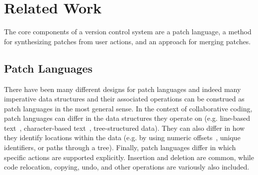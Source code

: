 
\section{Related Work}%
\label{sec:Related Work}

The core components of a version control system are a patch language, a method for synthesizing patches from user actions, and an approach for merging patches. 




\subsection{Patch Languages}
There have been many different designs for patch languages and indeed many imperative data structures and their associated operations can be construed as patch languages in the most general sense. In the context of collaborative coding, patch languages can differ in the data structures they operate on (e.g. line-based text~\cite{DBLP:conf/haskell/Roundy05}, character-based text~\cite{DBLP:conf/sigmod/EllisG89,DBLP:journals/pacmhci/LittLKH22}, tree-structured data). 
They can also differ in how they identify locations within the data (e.g. by using numeric offsets~\cite{DBLP:conf/sigmod/EllisG89}, unique identifiers, or paths through a tree).
Finally, patch languages differ in which specific actions are supported explicitly. Insertion and deletion are common, while code relocation, copying, undo, and other operations are variously also included.

